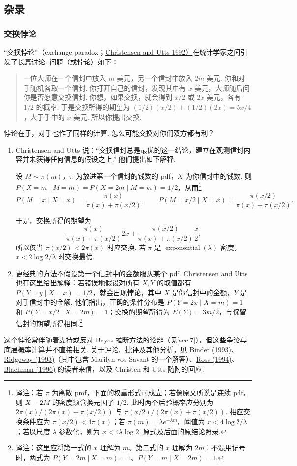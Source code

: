 \subsection{杂录}\label{sec:4.9}
\subsubsection{交换悖论}\label{sec:4.9.1}\label{misc:4.9.1}
“交换悖论”（exchange paradox；\hyperref[bib:source76]{Christensen and Utts 1992）}在统计学家之间引发了长篇讨论. 问题（或悖论）如下：
\begin{quote}
一位大师在一个信封中放入 $m$ 美元，另一个信封中放入 $2m$ 美元. 你和对手随机各取一个信封. 你打开自己的信封，发现其中有 $x$ 美元，大师随后问你是否愿意交换信封. 你想，如果交换，就会得到 $x/2$ 或 $2x$ 美元，各有 $1/2$ 的概率. 于是交换所得的期望为 $(1/2)(x/2)+(1/2)(2x)=5x/4$，大于手中的 $x$ 美元. 所以你提出交换.
\end{quote}
悖论在于，对手也作了同样的计算. 怎么可能交换对你们双方都有利？
\begin{enumerate}
\item[(i)] Christensen and Utts 说：“交换信封总是最优的这一结论，建立在观测信封内容并未获得任何信息的假设之上.” 他们提出如下解释.

设 $M\sim\pi(m)$，$\pi$ 为放进第一个信封的钱数的 pdf，$X$ 为你信封中的钱数. 则 $P(X=m\mid M=m)=P(X=2m\mid M=m)=1/2$，从而\footnote{译注：若 $\pi$ 为离散 pmf，下面的权重形式可成立；若像原文所说是连续 pdf，则 $X=2M$ 的密度须含换元因子 $1/2$. 此时两个后验概率应分别为 $2\pi(x)/(2\pi(x)+\pi(x/2))$ 与 $\pi(x/2)/(2\pi(x)+\pi(x/2))$. 相应交换条件应为 $\pi(x/2)<4\pi(x)$；若 $\pi(m)=\lambda e^{-\lambda m}$，阈值为 $x<4\log2/\lambda$；若以尺度 $\lambda$ 参数化，则为 $x<4\lambda\log2$. 原式及后面的原结论照录.}
$$P(M=x\mid X=x)=\frac{\pi(x)}{\pi(x)+\pi(x/2)},\qquad
P(M=x/2\mid X=x)=\frac{\pi(x/2)}{\pi(x)+\pi(x/2)}.$$

于是，交换所得的期望为
$$\frac{\pi(x)}{\pi(x)+\pi(x/2)}2x+\frac{\pi(x/2)}{\pi(x)+\pi(x/2)}\frac x2,$$
所以仅当 $\pi(x/2)<2\pi(x)$ 时应交换. 若 $\pi$ 是 $\operatorname{exponential}(\lambda)$ 密度，$x<2\log2/\lambda$ 时交换最优.
\item[(ii)] 更经典的方法不假设第一个信封中的金额服从某个 pdf. Christensen and Utts 也在这里给出解释：若错误地假设对所有 $X,Y$ 的取值都有 $P(Y=y\mid X=x)=1/2$，就会出现悖论，其中 $X$ 是你信封中的金额，$Y$ 是对手信封中的金额. 他们指出，正确的条件分布是 $P(Y=2x\mid X=m)=1$ 和 $P(Y=x/2\mid X=2m)=1$；交换的期望所得为 $E(Y)=3m/2$，与保留信封的期望所得相同.\footnote{译注：这里应将第一式的 $x$ 理解为 $m$、第二式的 $x$ 理解为 $2m$；不混用记号时，两式为 $P(Y=2m\mid X=m)=1$、$P(Y=m\mid X=2m)=1$.}
\end{enumerate}
这个悖论常伴随着支持或反对 Bayes 推断方法的论辩（见\autoref{sec:7}），但这些争论与底层概率计算并不直接相关. 关于评论、批评及其他分析，见 \hyperref[bib:source34]{Binder (1993)}、\hyperref[bib:source252]{Ridgeway (1993)}（其中包含 Marilyn vos Savant 的一个解答）、\hyperref[bib:source260]{Ross (1994)}、\hyperref[bib:source36]{Blachman (1996)} 的读者来信，以及 Christen 和 Utts 随附的回应.

